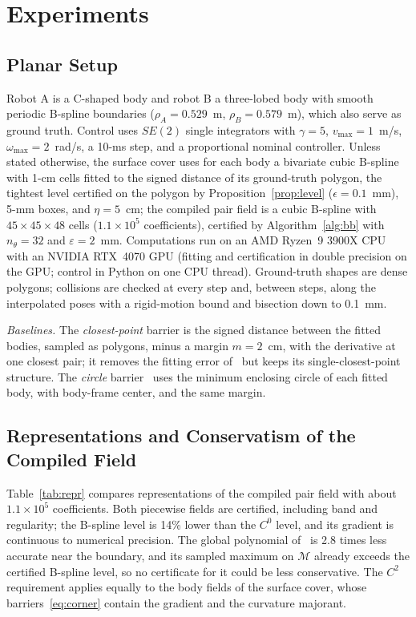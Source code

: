 \documentclass[journal]{IEEEtran}
\theoremstyle{definition}
\newcommand{\Mset}{\mathcal{M}}
\begin{document}
\section{Experiments}\label{sec:exp}

\subsection{Planar Setup}
Robot A is a C-shaped body and robot B a three-lobed body with smooth periodic B-spline boundaries
($\rho_A=0.529$~m, $\rho_B=0.579$~m), which also serve as ground truth. Control uses $SE(2)$ single
integrators with $\gamma=5$, $v_{\max}=1$~m/s, $\omega_{\max}=2$~rad/s, a 10-ms step, and a
proportional nominal controller. Unless stated otherwise, the surface cover uses for each body a
bivariate cubic B-spline with 1-cm cells fitted to the signed distance of its ground-truth polygon,
the tightest level certified on the polygon by Proposition~\ref{prop:level} ($\epsilon=0.1$~mm),
5-mm boxes, and $\eta=5$~cm; the compiled pair field is a cubic B-spline with $45\times45\times48$
cells ($1.1\times10^5$ coefficients), certified by Algorithm~\ref{alg:bb} with $n_\theta=32$ and
$\varepsilon=2$~mm. Computations run on an AMD Ryzen~9 3900X CPU with an NVIDIA RTX~4070 GPU
(fitting and certification in double precision on the GPU; control in Python on one CPU thread).
Ground-truth shapes are dense polygons; collisions are checked at every step and, between
steps, along the interpolated poses with a rigid-motion bound and bisection down to 0.1~mm.

\emph{Baselines.} The \emph{closest-point} barrier is the signed distance between the fitted bodies,
sampled as polygons, minus a margin $m=2$~cm, with the derivative at one closest pair; it
removes the fitting error of~\cite{jo2026geometry} but keeps its single-closest-point structure.
The \emph{circle} barrier~\cite{wang2017safety} uses the minimum enclosing circle of each fitted
body, with body-frame center, and the same margin.

\subsection{Representations and Conservatism of the Compiled Field}\label{sec:exp-repr}
Table~\ref{tab:repr} compares representations of the compiled pair field with about
$1.1\times10^5$ coefficients. Both piecewise fields are certified, including band and regularity; the
B-spline level is 14\% lower than the $C^0$ level, and its gradient is continuous to numerical
precision. The global polynomial of~\cite{jo2026geometry} is 2.8 times less accurate near the
boundary, and its sampled maximum on $\Mset$ already exceeds the certified B-spline level, so no
certificate for it could be less conservative. The $C^2$ requirement applies equally to the body
fields of the surface cover, whose barriers~\eqref{eq:corner} contain the gradient and the curvature
majorant.
\end{document}
